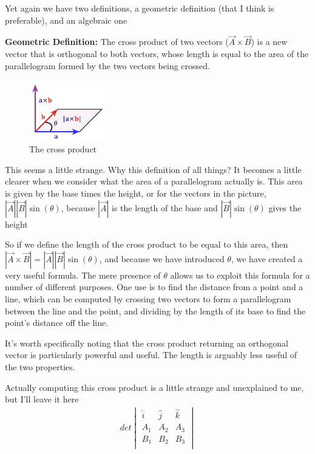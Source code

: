 \documentclass[12pt, letterpaper]{article}
\begin{document}
Yet again we have two definitions, a geometric definition (that I think is preferable), and an algebraic one

\textbf{Geometric Definition:} The cross product of two vectors ($\vec{A} \times \vec{B}$) is a new vector that is orthogonal to both vectors, whose length is equal to the area of the parallelogram formed by the two vectors being crossed.

\begin{figure}[h]
    \centering 
    \includegraphics[width=0.30\textwidth]{crossproduct}
    \caption{The cross product}
\end{figure}

This seems a little strange. Why this definition of all things? It becomes a little clearer when we consider what the area of a parallelogram actually is.
This area is given by the base times the height, or for the vectors in the picture, $|\vec{A}| |\vec{B}|\sin(\theta)$, because $|\vec{A}|$ is the length of the base and $|\vec{B}|\sin(\theta)$ gives the height

So if we define the length of the cross product to be equal to this area, then $|\vec{A} \times \vec{B}| = |\vec{A}| |\vec{B}|\sin(\theta)$, and because we have introduced $\theta$, we have created a very useful formula.
The mere presence of $\theta$ allows us to exploit this formula for a number of different purposes.
One use is to find the distance from a point and a line, which can be computed by crossing two vectors to form a parallelogram between the line and the point, and dividing by the length of its base to find the point's distance off the line.

It's worth specifically noting that the cross product returning an orthogonal vector is particularly powerful and useful. The length is arguably less useful of the two properties.

Actually computing this cross product is a little strange and unexplained to me, but I'll leave it here
\begin{align*}
    det
    \begin{vmatrix}
        \hat{i} & \hat{j} & \hat{k} \\
        A_1 & A_2 & A_3 \\
        B_1 & B_2 & B_3 \\
    \end{vmatrix}
\end{align*}
\end{document}
